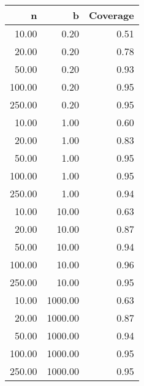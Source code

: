 
\begin{tabular}{rrr}
  \hline
n & b & Coverage \\ 
  \hline
10.00 & 0.20 & 0.51 \\ 
  20.00 & 0.20 & 0.78 \\ 
  50.00 & 0.20 & 0.93 \\ 
  100.00 & 0.20 & 0.95 \\ 
  250.00 & 0.20 & 0.95 \\ 
  10.00 & 1.00 & 0.60 \\ 
  20.00 & 1.00 & 0.83 \\ 
  50.00 & 1.00 & 0.95 \\ 
  100.00 & 1.00 & 0.95 \\ 
  250.00 & 1.00 & 0.94 \\ 
  10.00 & 10.00 & 0.63 \\ 
  20.00 & 10.00 & 0.87 \\ 
  50.00 & 10.00 & 0.94 \\ 
  100.00 & 10.00 & 0.96 \\ 
  250.00 & 10.00 & 0.95 \\ 
  10.00 & 1000.00 & 0.63 \\ 
  20.00 & 1000.00 & 0.87 \\ 
  50.00 & 1000.00 & 0.94 \\ 
  100.00 & 1000.00 & 0.95 \\ 
  250.00 & 1000.00 & 0.95 \\ 
   \hline
\end{tabular}